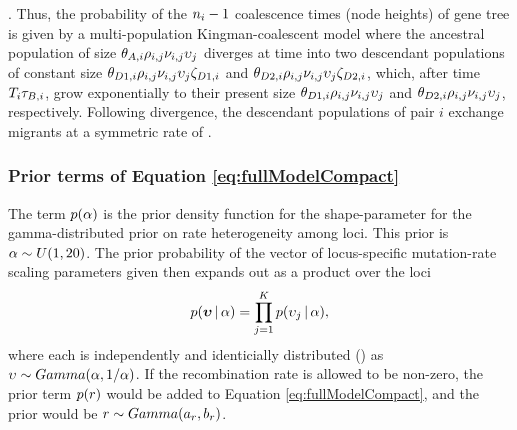 \documentclass[letterpaper,12pt]{article}
\begin{document}
\begin{linenumbers}
\begin{linenomath}
\migrationRate{}.
Thus, the probability of the $\popSampleSize{i}{}-1$ coalescence times (node
heights) of gene tree  is given by a multi-population
Kingman-coalescent model \citep{Kingman1982} where the ancestral population of
size
$\ancestralTheta{i}\ploidyScalar{i}{j}\mutationRateScalarConstant{i}{j}\locusMutationRateScalar{j}$
diverges at time  into two descendant populations of constant
size
$\descendantTheta{1}{i}\ploidyScalar{i}{j}\mutationRateScalarConstant{i}{j}\locusMutationRateScalar{j}\bottleScalar{1}{i}$
and
$\descendantTheta{2}{i}\ploidyScalar{i}{j}\mutationRateScalarConstant{i}{j}\locusMutationRateScalar{j}\bottleScalar{2}{i}$,
which, after time $\divTimeMap{i}\bottleTime{i}$, grow exponentially to their
present size 
$\descendantTheta{1}{i}\ploidyScalar{i}{j}\mutationRateScalarConstant{i}{j}\locusMutationRateScalar{j}$
and
$\descendantTheta{2}{i}\ploidyScalar{i}{j}\mutationRateScalarConstant{i}{j}\locusMutationRateScalar{j}$,
respectively.
Following divergence, the descendant populations of pair $i$ exchange migrants at a symmetric rate of
.
\end{linenomath}


\subsubsection*{Prior terms of Equation \ref{eq:fullModelCompact}}
\begin{linenomath}
The term $p(\alpha)$ is the prior density
function for the shape-parameter for the gamma-distributed prior on
rate heterogeneity among loci.
This prior is $\alpha \sim U(1, 20)$.
The prior probability of the vector of locus-specific mutation-rate scaling parameters
given \locusRateHetShapeParameter then expands out as a product over
the loci
\begin{equation}
    p(\boldsymbol{\upsilon} \,|\, \alpha) =
    \prod_{j=1}^{K}
    p(\upsilon_{j} \,|\, \alpha),
    \label{eq:locusRateHetPrior}
\end{equation}
where each \locusMutationRateScalar{} is independently and identicially
distributed (\iid) as
$\upsilon_{} \sim Gamma(\alpha,
1/\alpha)$.
If the recombination rate \recombinationRate is allowed to be
non-zero, the prior term $p(r)$ would be added
to Equation \ref{eq:fullModelCompact}, and the prior would be
$r \sim Gamma(a_{r},
b_{r})$.
\end{linenomath}


\end{linenumbers}
\end{document}
